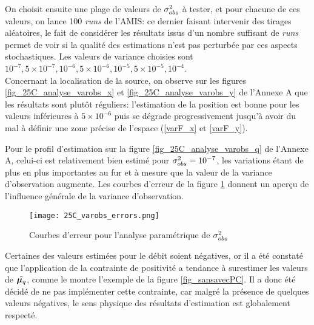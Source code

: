 On choisit ensuite une plage de valeurs de ${\sigma_{obs}^2}$ à tester, et pour chacune de ces valeurs, on lance 100 \textit{runs} de l'AMIS: ce dernier faisant intervenir des tirages aléatoires, le fait de considérer les résultats issus d'un nombre suffisant de \textit{runs} permet de voir si la qualité des estimations n'est pas perturbée par ces aspects stochastiques. Les valeurs de variance choisies sont $10^{-7}, 5\times 10^{-7}, 10^{-6}, 5\times 10^{-6}, 10^{-5}, 5\times 10^{-5},10^{-4}$. \\
   
         Concernant la localisation de la source, on observe sur les figures \ref{fig_25C_analyse_varobs_x} et \ref{fig_25C_analyse_varobs_y} de l'Annexe A que les résultats sont plutôt réguliers: l'estimation de la position est bonne pour les valeurs inférieures à $5\times 10^{-6}$ puis se dégrade progressivement jusqu'à avoir du mal à définir une zone précise de l'espace (\ref{varF_x} et \ref{varF_y}).
         
         Pour le profil d'estimation sur la figure \ref{fig_25C_analyse_varobs_q} de l'Annexe A, celui-ci est relativement bien estimé pour ${\sigma_{obs}^2}=10^{-7}$, les variations étant de plus en plus importantes au fur et à mesure que la valeur de la variance d'observation augmente. Les courbes d'erreur de la figure \ref{fig_25C_varobs_erreurs} donnent un aperçu de l'influence générale de la variance d'observation.
         
         \begin{figure}[h!]
         	\centering
         	\texttt{[image: 25C\_varobs\_errors.png]}
         	\caption{Courbes d'erreur pour l'analyse paramétrique de ${\sigma_{obs}^2}$}
         	\label{fig_25C_varobs_erreurs}
         \end{figure}
         
         
         Certaines des valeurs estimées pour le débit soient négatives, or il a été constaté que l'application de la contrainte de positivité a tendance à surestimer les valeurs de $\tilde{{\bm{\mu}_q}}$, comme le montre l'exemple de la figure \ref{fig_sansavecPC}. Il a donc été décidé de ne pas implémenter cette contrainte, car malgré la présence de quelques valeurs négatives, le sens physique des résultats d'estimation est globalement respecté.\\
       
